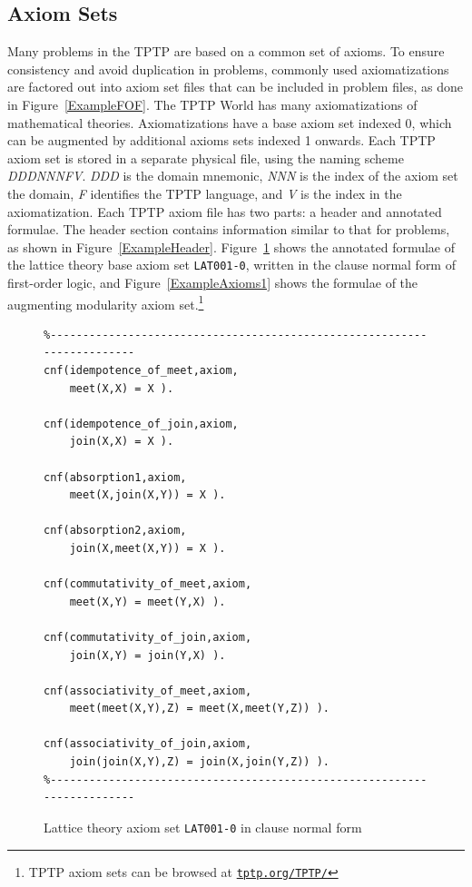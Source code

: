 \documentclass[runningheads]{llncs}
\begin{document}
\subsection{Axiom Sets}
\label{AxiomsSets}

Many problems in the TPTP are based on a common set of axioms.
To ensure consistency and avoid duplication in problems, commonly used axiomatizations are
factored out into axiom set files that can be included in problem files, as done in
Figure~\ref{ExampleFOF}.
The TPTP World has many axiomatizations of mathematical theories.
Axiomatizations have a base axiom set indexed 0, which can be augmented by additional
axioms sets indexed 1 onwards.
Each TPTP axiom set is stored in a separate physical file, using the naming scheme
{\em DDDNNNFV}.
{\em DDD} is the domain mnemonic, {\em NNN} is the index of the axiom set the domain,
{\em F} identifies the TPTP language, and {\em V} is the index in the axiomatization.
Each TPTP axiom file has two parts: a header and annotated formulae.
The header section contains information similar to that for problems, as shown in 
Figure~\ref{ExampleHeader}.
Figure~\ref{ExampleAxioms0} shows the annotated formulae of the lattice theory base axiom set 
{\tt LAT001-0}, written in the clause normal form of first-order logic, and 
Figure~\ref{ExampleAxioms1} shows the formulae of the augmenting modularity axiom set.\footnote{%
TPTP axiom sets can be browsed at \href{https://tptp.org/TPTP/}{{\tt tptp.org/TPTP/}}}

\begin{figure}[tb]
\centering
{\footnotesize
{\setlength{\baselineskip}{3mm}
\begin{verbatim}
%------------------------------------------------------------------------
cnf(idempotence_of_meet,axiom,
    meet(X,X) = X ).

cnf(idempotence_of_join,axiom,
    join(X,X) = X ).

cnf(absorption1,axiom,
    meet(X,join(X,Y)) = X ).

cnf(absorption2,axiom,
    join(X,meet(X,Y)) = X ).

cnf(commutativity_of_meet,axiom,
    meet(X,Y) = meet(Y,X) ).

cnf(commutativity_of_join,axiom,
    join(X,Y) = join(Y,X) ).

cnf(associativity_of_meet,axiom,
    meet(meet(X,Y),Z) = meet(X,meet(Y,Z)) ).

cnf(associativity_of_join,axiom,
    join(join(X,Y),Z) = join(X,join(Y,Z)) ).
%------------------------------------------------------------------------
\end{verbatim}
}}
\caption{Lattice theory axiom set {\tt LAT001-0} in clause normal form}
\label{ExampleAxioms0}
\end{figure}
\end{document}
